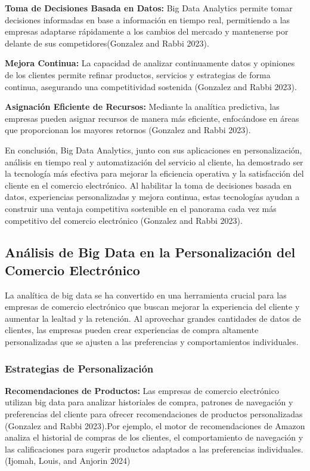 \documentclass{article}
\begin{document}
\textbf{Toma de Decisiones Basada en Datos:} Big Data Analytics permite
tomar decisiones informadas en base a información en tiempo real,
permitiendo a las empresas adaptarse rápidamente a los cambios del
mercado y mantenerse por delante de sus competidores(Gonzalez and Rabbi
2023).

\textbf{Mejora Continua:} La capacidad de analizar continuamente datos y
opiniones de los clientes permite refinar productos, servicios y
estrategias de forma continua, asegurando una competitividad sostenida
(Gonzalez and Rabbi 2023).

\textbf{Asignación Eficiente de Recursos:} Mediante la analítica
predictiva, las empresas pueden asignar recursos de manera más
eficiente, enfocándose en áreas que proporcionan los mayores retornos
(Gonzalez and Rabbi 2023).

En conclusión, Big Data Analytics, junto con sus aplicaciones en
personalización, análisis en tiempo real y automatización del servicio
al cliente, ha demostrado ser la tecnología más efectiva para mejorar la
eficiencia operativa y la satisfacción del cliente en el comercio
electrónico. Al habilitar la toma de decisiones basada en datos,
experiencias personalizadas y mejora continua, estas tecnologías ayudan
a construir una ventaja competitiva sostenible en el panorama cada vez
más competitivo del comercio electrónico (Gonzalez and Rabbi 2023).

\subsection{Análisis de Big Data en la Personalización del Comercio
Electrónico}\label{anuxe1lisis-de-big-data-en-la-personalizaciuxf3n-del-comercio-electruxf3nico}

La analítica de big data se ha convertido en una herramienta crucial
para las empresas de comercio electrónico que buscan mejorar la
experiencia del cliente y aumentar la lealtad y la retención. Al
aprovechar grandes cantidades de datos de clientes, las empresas pueden
crear experiencias de compra altamente personalizadas que se ajusten a
las preferencias y comportamientos individuales.

\subsubsection{Estrategias de
Personalización}\label{estrategias-de-personalizaciuxf3n}

\textbf{Recomendaciones de Productos:} Las empresas de comercio
electrónico utilizan big data para analizar historiales de compra,
patrones de navegación y preferencias del cliente para ofrecer
recomendaciones de productos personalizadas (Gonzalez and Rabbi
2023).Por ejemplo, el motor de recomendaciones de Amazon analiza el
historial de compras de los clientes, el comportamiento de navegación y
las calificaciones para sugerir productos adaptados a las preferencias
individuales.(Ijomah, Louis, and Anjorin 2024) 
\end{document}
